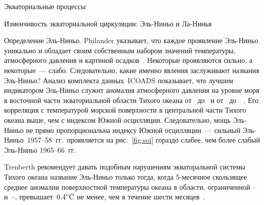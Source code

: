 \begin{chapter}{Экваториальные процессы}
\begin{section}{Изменчивость экваториальной циркуляции: Эль-Ниньо и Ла-Нинья}
\begin{paragraph}{Определение Эль-Ниньо.}
%
Philander указывает, что каждое проявление Эль-Ниньо уникально и обладает
своим собственным набором значений температуры, атмосферного давления и
картиной осадков~\cite{Philander:1990}. 
Некоторые проявляются сильно, а некоторые~--- слабо. Следовательно, какие
именно явления заслуживают названия Эль-Ниньо? Анализ комплекта данных~ICOADS%
показывает, что лучшим индикатором Эль-Ниньо служит аномалия атмосферного 
давления на уровне моря в восточной части экваториальной области Тихого океана
от~ до~ и от~ 
до~~\cite{Harrison:1996}.
Его корреляция с температурой морской поверхности
в центральной части Тихого океана выше, чем с индексом Южной осцилляции.
Следовательно, мощь Эль-Ниньо не прямо пропорциональна индексу Южной
осцилляции~--- сильный Эль-Ниньо~1957--58~гг.\
проявляется на рис.~\ref{fig:soi} гораздо слабее, чем более слабый Эль-Ниньо
1965--66~гг.
%

Trenberth рекомендует давать подобным нарушениям экваторальной системы
Тихого океана название Эль-Ниньо только тогда, когда 5-месячное скользящее 
среднее аномалии поверхностной температуры океана%
 в области, ограниченной
\latlon{5}{N}--\latlon{5}{S} и~\latlon{120}{W}--\latlon{170}{W}, 
превышает~${0.4}^\circ\mbox{C}$ не менее, чем в течение шести месяцев~\cite{Trenberth:1997b}.
%


\end{paragraph}
\end{section}
\end{chapter}
